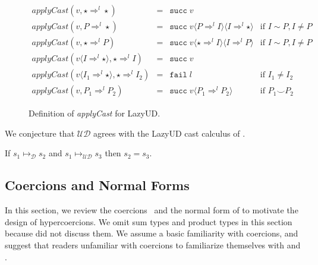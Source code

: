 \documentclass[acmsmall,review]{acmart}\settopmatter{printfolios=true,printccs=false,printacmref=false}
\newcommand{\lazyUD}{Lazy\;UD}
\newcommand{\cOOcast}[3]{#1 \Rightarrow^{#2} #3}
\newcommand{\rOOsucc}[1]{\mathtt{succ}\;#1}
\newcommand{\rOOfail}[1]{\mathtt{fail}\;#1}
\newcommand{\ineffCEKUD}{\ensuremath{\mathcal{UD}}}
\newcommand{\judgeDreduce}[2]{#1 \longmapsto_{\mathcal{D}} #2}
\newcommand{\judgeUDreduce}[2]{#1 \longmapsto_{\mathcal{UD}} #2}
\begin{document}
\begin{figure}
  \[
  \begin{array}{rclr}
    \mathit{applyCast}(v, \cOOcast{\star}{l}{\star} ) &=& \rOOsucc{v} \\
    \mathit{applyCast}(v, \cOOcast{P}{l}{\star}) &=&
        \rOOsucc{v \langle \cOOcast{P}{l}{I} \rangle
                   \langle \cOOcast{I}{l}{\star} \rangle}
        & \text{if } I \sim P, I \neq P \\  
    \mathit{applyCast}(v, \cOOcast{\star}{l}{P}) &=&          
        \rOOsucc{v \langle \cOOcast{\star}{l}{I} \rangle
                   \langle \cOOcast{I}{l}{P} \rangle}
        & \text{if } I \sim P, I \neq P \\  
  \mathit{applyCast}(v \langle \cOOcast{I}{l}{\star} \rangle , \cOOcast{\star}{l}{I}) &=& \rOOsucc{v} \\
  \mathit{applyCast}(v \langle \cOOcast{I_1}{l}{\star} \rangle , \cOOcast{\star}{l}{I_2}) &=& \rOOfail{l} & \text{if } I_1 \neq I_2 \\
  \mathit{applyCast}(v, \cOOcast{P_1}{l}{P_2}) &=&
           \rOOsucc{v \langle \cOOcast{P_1}{l}{P_2} \rangle}
          & \text{if } P_1 \smile P_2
  \end{array}
  \]

  \caption{Definition of \textit{applyCast} for \lazyUD{}.}
  \label{fig:apply-Cast-UD}
\end{figure}

We conjecture that \ineffCEKUD{} agrees with the \lazyUD{} cast
calculus of \citet{siek2009exploring}.

\begin{proposition}[\ineffCEKUD{} is deterministic]
	If $\judgeDreduce{s_1}{s_2}$ and $\judgeUDreduce{s_1}{s_3}$ then $s_2 = 
	s_3$.
\end{proposition}

\subsection{Coercions and Normal Forms} 
\label{sec:coercion-calculus}

In this section, we review the
coercions~\citep{henglein1994dynamic,herman2010space} and the normal form of
\citet{siek2012interpretations} to motivate the design of hypercoercions.  We
omit sum types and product types in this section because
\citet{siek2012interpretations} did not discuss them. We assume a basic
familiarity with coercions, and suggest that readers unfamiliar with coercions
to familiarize themselves with \citet{siek2012interpretations} and
\citet{Siek:2015:BCT:2737924.2737968}.
\end{document}
